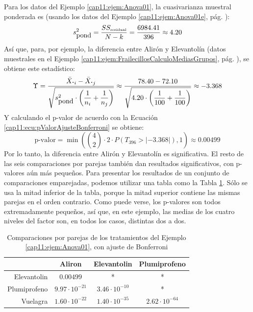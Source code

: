 \begin{ejemplo}
\label{cap11:ejem:BonferroniFrailecillos}
Para los datos del Ejemplo \ref{cap11:ejem:Anova01}, la cuasivarianza muestral ponderada es (usando los datos del Ejemplo \ref{cap11:ejem:Anova01e}, pág. \pageref{cap11:ejem:Anova01e}):
\[
s_{\mbox{pond}}^2=\dfrac{SS_{\mbox{\tiny residual}}}{N-k}=\dfrac{6984.41}{396}\approx 4.20
\]
Así que, para, por ejemplo, la diferencia entre { Alirón} y { Elevantolín} (datos muestrales en el Ejemplo \ref{cap11:ejem:FrailecillosCalculoMediasGrupos}, pág. \pageref{cap11:ejem:FrailecillosCalculoMediasGrupos}), se obtiene este estadístico:
\[\Upsilon=
\dfrac{\bar X_{{\mbox{\bf\large$\cdot$}}i}-\bar X_{{\mbox{\bf\large$\cdot$}}j}}{
{\sqrt{s_{\mbox{pond}}^2\cdot\left(\dfrac{1}{n_i}+\dfrac{1}{n_j}\right)}}}
\approx
\dfrac{78.40-72.10}{{\sqrt{4.20\cdot\left(\dfrac{1}{100}+\dfrac{1}{100}\right)}}}
\approx -3.368
\]
Y calculando el p-valor de acuerdo con la Ecuación \ref{cap11:ecu:pValorAjusteBonferroni} se obtiene:
\[
\mbox{p-valor}=
\min\left({\binom{4}{2}}\cdot 2\cdot P\left( T_{396}>|-3.368|\right), 1\right)
\approx 0.00499
\]
Por lo tanto, la diferencia entre { Alirón} y { Elevantolín} es significativa. El resto de las seis comparaciones por parejas también dan resultados significativos, con p-valores aún más pequeños. Para presentar los resultados de un conjunto de comparaciones emparejadas, podemos utilizar una tabla como la Tabla \ref{cap11:tabla:BonferroniFrailecillos}. Sólo se usa  la mitad inferior de la tabla, porque la mitad superior contiene las mismas parejas en el orden contrario. Como puede verse, los p-valores son todos extremadamente pequeños, así que, en este ejemplo, las medias de los cuatro niveles del factor son, en todos los casos, distintas dos a dos.


\begin{table}[ht]
\centering
\begin{tabular}{rccc}
  \hline
 & Aliron & Elevantolin & Plumiprofeno \\
  \hline
Elevantolin & $0.00499$ & * & * \\
  Plumiprofeno & $9.97\cdot 10^{-21}$ & $3.46\cdot 10^{-10}$ & * \\
  Vuelagra & $1.60\cdot 10^{-22}$ & $1.40\cdot 10^{-35}$ & $2.62\cdot 10^{-64}$ \\
   \hline
\end{tabular}
\caption{Comparaciones por parejas de los tratamientos del Ejemplo \ref{cap11:ejem:Anova01}, con ajuste de Bonferroni}
\label{cap11:tabla:BonferroniFrailecillos}
\end{table}


\end{ejemplo}

